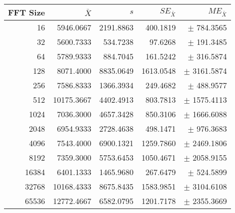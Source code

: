 \begin{tabular}{|r|r|r|r|r|}\hline
    FFT Size & $\bar{X}$ & $s$ & $SE_{\bar{X}}$ & $ME_{\bar{X}}$ \\ \hline
    16 & 5946.0667 & 2191.8863 & 400.1819 & $\pm$ 784.3565 \\ \hline
    32 & 5600.7333 & 534.7238 & 97.6268 & $\pm$ 191.3485 \\ \hline
    64 & 5789.9333 & 884.7045 & 161.5242 & $\pm$ 316.5874 \\ \hline
    128 & 8071.4000 & 8835.0649 & 1613.0548 & $\pm$ 3161.5874 \\ \hline
    256 & 7586.8333 & 1366.3934 & 249.4682 & $\pm$ 488.9577 \\ \hline
    512 & 10175.3667 & 4402.4913 & 803.7813 & $\pm$ 1575.4113 \\ \hline
    1024 & 7036.3000 & 4657.3428 & 850.3106 & $\pm$ 1666.6088 \\ \hline
    2048 & 6954.9333 & 2728.4638 & 498.1471 & $\pm$ 976.3683 \\ \hline
    4096 & 7543.4000 & 6900.1321 & 1259.7860 & $\pm$ 2469.1806 \\ \hline
    8192 & 7359.3000 & 5753.6453 & 1050.4671 & $\pm$ 2058.9155 \\ \hline
    16384 & 6401.1333 & 1465.9680 & 267.6479 & $\pm$ 524.5899 \\ \hline
    32768 & 10168.4333 & 8675.8435 & 1583.9851 & $\pm$ 3104.6108 \\ \hline
    65536 & 12772.4667 & 6582.0795 & 1201.7178 & $\pm$ 2355.3669 \\ \hline
\end{tabular}
